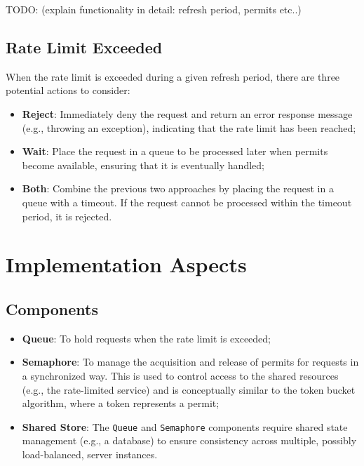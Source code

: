 TODO: (explain functionality in detail: refresh period, permits etc..)

\subsection{Rate Limit Exceeded}\label{subsec:rate-limiter-exceeded}

When the rate limit is exceeded during a given refresh period, there are three potential actions to consider:
\begin{itemize}
    \item \textbf{Reject}: Immediately deny the request and return an error response message (e.g., throwing an exception), indicating that the rate limit has been reached;
    \item \textbf{Wait}: Place the request in a queue to be processed later when permits become available, ensuring that it is eventually handled;
    \item \textbf{Both}: Combine the previous two approaches by placing the request in a queue with a timeout.
    If the request cannot be processed within the timeout period, it is rejected.
\end{itemize}


\section{Implementation Aspects}\label{sec:rate-limiter-implementation}

\subsection{Components}\label{subsec:rate-limiter-components}

\begin{itemize}
    \item \textbf{Queue}: To hold requests when the rate limit is exceeded;
    \item \textbf{Semaphore}: To manage the acquisition and release of permits for requests in a synchronized way.
    This is used to control access to the shared resources (e.g., the rate-limited service) and is conceptually similar to the token bucket algorithm, where a token represents a permit;
    \item \textbf{Shared Store}: The \texttt{Queue} and \texttt{Semaphore} components require shared state management (e.g., a database) to ensure consistency across multiple, possibly load-balanced, server instances.
\end{itemize}

